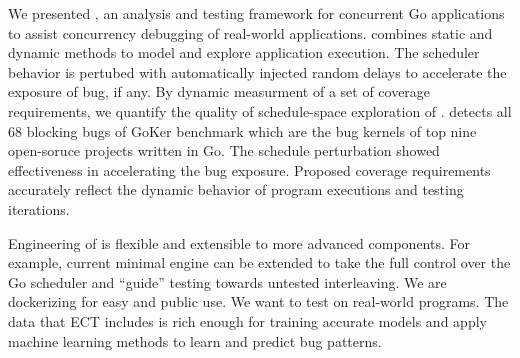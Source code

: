 We presented \goat, an analysis and testing framework for concurrent Go applications to assist concurrency debugging of real-world applications.
%
\goat combines static and dynamic methods to model and explore application execution.
%
The scheduler behavior is pertubed with automatically injected random delays to accelerate the exposure of bug, if any.
%
By dynamic measurment of a set of coverage requirements, we quantify the quality of schedule-space exploration of \goat.
%
\goat detects all 68 blocking bugs of GoKer benchmark which are the bug kernels of top nine open-soruce projects written in Go.
%
The schedule perturbation showed effectiveness in accelerating the bug exposure.
%
Proposed coverage requirements accurately reflect the dynamic behavior of program executions and testing iterations.

Engineering of \goat is flexible and extensible to more advanced components.
%
For example, current minimal \goat engine can be extended to take the full control over the Go scheduler and ``guide'' testing towards untested interleaving.
%
We are dockerizing \goat for easy and public use.
%
We want to test on real-world programs.
%
The data that ECT includes is rich enough for training accurate models and apply machine learning methods to learn and predict bug patterns.

